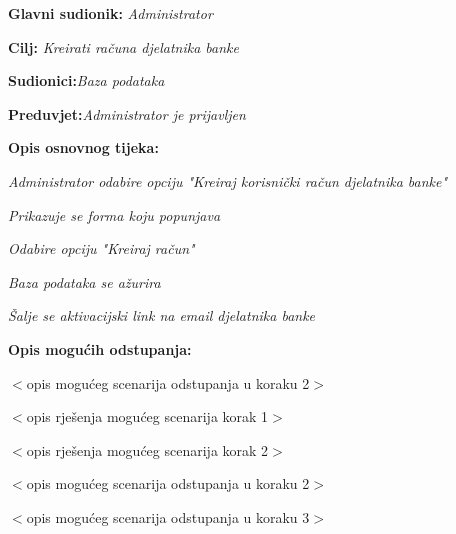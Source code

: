\noindent {}
\begin{packed_item}
	
	\item \textbf{Glavni sudionik: }\textit{Administrator}\eject
	\item  \textbf{Cilj:} \textit{Kreirati računa djelatnika banke}\eject
	\item  \textbf{Sudionici:}\textit{Baza podataka}\eject 
	\item  \textbf{Preduvjet:}\textit{Administrator je prijavljen}\eject
	\item  \textbf{Opis osnovnog tijeka:}
	
	\item[] \begin{packed_enum}
		
		\item \textit{Administrator odabire opciju "Kreiraj korisnički račun djelatnika banke"}\eject
		\item \textit{Prikazuje se forma koju popunjava}\eject 
		\item \textit{Odabire opciju "Kreiraj račun"}\eject 
		\item \textit{Baza podataka se ažurira}\eject
		\item \textit{Šalje se aktivacijski link na email djelatnika banke}\eject
	\end{packed_enum}
	
	\item  \textbf{Opis mogućih odstupanja:}
	
	\item[] \begin{packed_item}
		
		\item[2.a] $<$opis mogućeg scenarija odstupanja u koraku 2$>$
		\item[] \begin{packed_enum}
			
			\item $<$opis rješenja mogućeg scenarija korak 1$>$
			\item $<$opis rješenja mogućeg scenarija korak 2$>$
			
		\end{packed_enum}
		\item[2.b] $<$opis mogućeg scenarija odstupanja u koraku 2$>$
		\item[3.a] $<$opis mogućeg scenarija odstupanja  u koraku 3$>$
		
	\end{packed_item}
\end{packed_item}



